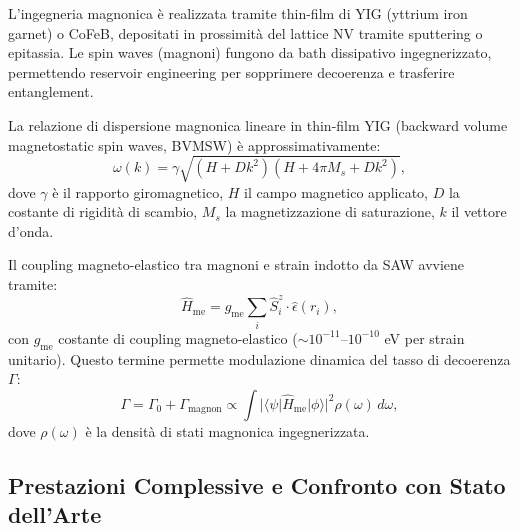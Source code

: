\documentclass[12pt,a4paper]{article}
\begin{document}
L'ingegneria magnonica è realizzata tramite thin-film di YIG (yttrium iron garnet) o CoFeB, depositati in prossimità del lattice NV tramite sputtering o epitassia. Le spin waves (magnoni) fungono da bath dissipativo ingegnerizzato, permettendo reservoir engineering per sopprimere decoerenza e trasferire entanglement.

La relazione di dispersione magnonica lineare in thin-film YIG (backward volume magnetostatic spin waves, BVMSW) è approssimativamente:
\begin{equation}
\omega(k) = \gamma \sqrt{ (H + D k^2)(H + 4\pi M_s + D k^2) },
\label{eq:magnon_dispersion}
\end{equation}
dove $\gamma$ è il rapporto giromagnetico, $H$ il campo magnetico applicato, $D$ la costante di rigidità di scambio, $M_s$ la magnetizzazione di saturazione, $k$ il vettore d'onda.

Il coupling magneto-elastico tra magnoni e strain indotto da SAW avviene tramite:
\begin{equation}
\hat{H}_{\mathrm{me}} = g_{\mathrm{me}} \sum_{i} \hat{S}_i^z \cdot \hat{\epsilon}(r_i),
\label{eq:magnetoelastic}
\end{equation}
con $g_{\mathrm{me}}$ costante di coupling magneto-elastico ($\sim 10^{-11}$--$10^{-10}$ eV per strain unitario). Questo termine permette modulazione dinamica del tasso di decoerenza $\Gamma$:
\begin{equation}
\Gamma = \Gamma_0 + \Gamma_{\mathrm{magnon}} \propto \int |\langle \psi | \hat{H}_{\mathrm{me}} | \phi \rangle|^2 \rho(\omega) \, d\omega,
\label{eq:decoherence_rate}
\end{equation}
dove $\rho(\omega)$ è la densità di stati magnonica ingegnerizzata.

\subsection{Prestazioni Complessive e Confronto con Stato dell'Arte}
\end{document}
